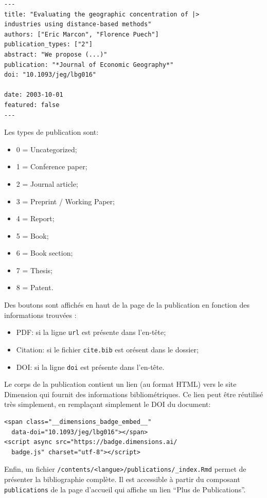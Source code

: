 \documentclass[
  11pt,
  french,
  a4paper,
  extrafontsizes,onecolumn,openright
  ]{memoir}
\providecommand{\tightlist}{%
  \setlength{\itemsep}{0pt}\setlength{\parskip}{0pt}}
\begin{document}
\begin{verbatim}
---
title: "Evaluating the geographic concentration of |>
industries using distance-based methods"
authors: ["Eric Marcon", "Florence Puech"]
publication_types: ["2"]
abstract: "We propose (...)"
publication: "*Journal of Economic Geography*"
doi: "10.1093/jeg/lbg016"

date: 2003-10-01
featured: false
---
\end{verbatim}

Les types de publication sont:

\begin{itemize}
\tightlist
\item
  0 = Uncategorized;
\item
  1 = Conference paper;
\item
  2 = Journal article;
\item
  3 = Preprint / Working Paper;
\item
  4 = Report;
\item
  5 = Book;
\item
  6 = Book section;
\item
  7 = Thesis;
\item
  8 = Patent.
\end{itemize}

Des boutons sont affichés en haut de la page de la publication en fonction des informations trouvées :

\begin{itemize}
\tightlist
\item
  PDF: si la ligne \texttt{url} est présente dans l'en-tête;
\item
  Citation: si le fichier \texttt{cite.bib} est orésent dans le dossier;
\item
  DOI: si la ligne \texttt{doi} est présente dans l'en-tête.
\end{itemize}

Le corps de la publication contient un lien (au format HTML) vers le site Dimension qui fournit des informations bibliométriques.
Ce lien peut être réutilisé très simplement, en remplaçant simplement le DOI du document:

\begin{verbatim}
<span class="__dimensions_badge_embed__" 
  data-doi="10.1093/jeg/lbg016"></span>
<script async src="https://badge.dimensions.ai/
  badge.js" charset="utf-8"></script>
\end{verbatim}

Enfin, un fichier \texttt{/contents/\textless{}langue\textgreater{}/publications/}\break\texttt{\_index.Rmd} permet de présenter la bibliographie complète.
Il est accessible à partir du composant \texttt{publications} de la page d'accueil qui affiche un lien ``Plus de Publications''.
\end{document}

